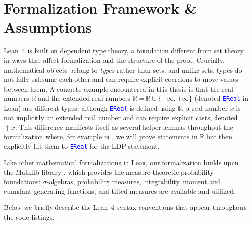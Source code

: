 \documentclass{article}
\newcommand{\leancode}[1]{\textcolor{blue}{\nolinkurl{#1}}}
\newcommand{\R}{\mathbb{R}}
\begin{document}
\section{Formalization Framework \& Assumptions}
\label{sec:framework}

Lean~4 is built on dependent type theory, a foundation different from set theory in ways that
affect formalization and the structure of the proof.
Crucially, mathematical objects belong to \emph{types} rather than sets, and unlike sets, types
do not fully subsume each other and can require explicit coercions to move values between them.
A concrete example encountered in this thesis is that the real numbers $\R$ and the extended real
numbers $\overline{\R} = \R \cup \{-\infty, +\infty\}$ (denoted \leancode{EReal} in Lean) are
different types: although \leancode{EReal} is defined using $\R$, a real number $x$ is not
implicitly an extended real number and can require explicit casts, denoted $\uparrow\! x$.
This difference manifests itself as several helper lemmas throughout the formalization where, for
example in , we will prove statements in $\R$ but then explicitly lift
them to \leancode{EReal} for the LDP statement.

Like other mathematical formalizations in Lean, our formalization builds upon the Mathlib library
\cite{mathlib2020}, which provides the measure-theoretic probability foundations:
$\sigma$-algebras, probability measures, integrability, moment and cumulant generating functions,
and tilted measures are available and utilized.

Below we briefly describe the Lean~4 syntax conventions that appear throughout the code listings.
\end{document}
